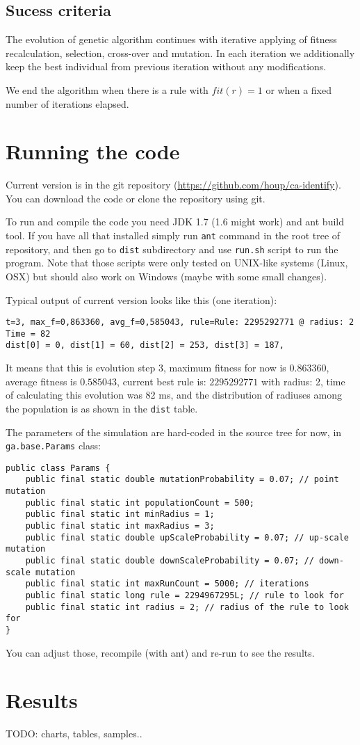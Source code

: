 \documentclass[12pt,a4paper]{article}
\begin{document}
\subsection{Sucess criteria}

The evolution of genetic algorithm continues with iterative applying of fitness recalculation, selection, cross-over and mutation. In each iteration we additionally keep the best individual from previous iteration without any modifications.

We end the algorithm when there is a rule with $fit(r)=1$ or when a fixed number of iterations elapsed. 

\section{Running the code}

Current version is in the git repository (\href{https://github.com/houp/ca-identify}{https://github.com/houp/ca-identify}). You can download the code or clone the repository using git. 

To run and compile the code you need JDK 1.7 (1.6 might work) and ant build tool. If you have all that installed simply run \verb+ant+ command in the root tree of repository, and then go to \verb+dist+ subdirectory and use \verb+run.sh+ script to run the program. Note that those scripts were only tested on UNIX-like systems (Linux, OSX) but should also work on Windows (maybe with some small changes).

Typical output of current version looks like this (one iteration):
\begin{verbatim}
t=3, max_f=0,863360, avg_f=0,585043, rule=Rule: 2295292771 @ radius: 2
Time = 82
dist[0] = 0, dist[1] = 60, dist[2] = 253, dist[3] = 187,
\end{verbatim}

It means that this is evolution step $3$, maximum fitness for now is $0.863360$, average fitness is $0.585043$, current best rule is: $2295292771$ with radius: 2, time of calculating this evolution was 82 ms, and the distribution of radiuses among the population is as shown in the \verb+dist+ table.

The parameters of the simulation are hard-coded in the source tree for now, in \verb+ga.base.Params+ class:
\begin{verbatim}
public class Params {
	public final static double mutationProbability = 0.07; // point mutation
	public final static int populationCount = 500; 
	public final static int minRadius = 1;
	public final static int maxRadius = 3;
	public final static double upScaleProbability = 0.07; // up-scale mutation
	public final static double downScaleProbability = 0.07; // down-scale mutation
	public final static int maxRunCount = 5000; // iterations
	public final static long rule = 2294967295L; // rule to look for
	public final static int radius = 2; // radius of the rule to look for
}
\end{verbatim}
You can adjust those, recompile (with ant) and re-run to see the results.



\section{Results}

TODO: charts, tables, samples..
\end{document}
